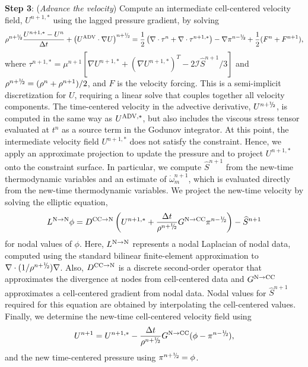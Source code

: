 {\bf Step 3}: ({\it Advance the velocity}) Compute an intermediate cell-centered velocity field, 
$U^{n+1,*}$ using the lagged pressure gradient, by solving
\begin{equation}
\rho^{n+\myhalf}\frac{U^{n+1,*}-U^n}{\Delta t} + \left(\uadv\cdot\nabla U\right)^{n+\myhalf} = \half\left(\nabla\cdot\tau^n + \nabla\cdot\tau^{n+1,*}\right) - \nabla\pi^{n-\myhalf} + \frac{1}{2}(F^n + F^{n+1}),
\label{eq:vel}
\end{equation}
where $\tau^{n+1,*} = \mu^{n+1}[\nabla U^{n+1,*} +(\nabla U^{n+1,*})^T - 2\mathcal{I}\widehat S^{n+1}/3]$ and 
$\rho^{n+\myhalf} = (\rho^n + \rho^{n+1})/2$, and $F$ is the velocity forcing.  This is a semi-implicit discretization for $U$, requiring
a linear solve that couples together all velocity components.  The time-centered velocity in the advective derivative,
$U^{n+\myhalf}$, is computed in the same way 
as $U^{{\rm ADV},*}$, but also includes the viscous stress tensor evaluated at $t^n$ as a source term
in the Godunov integrator.  At 
this point, the intermediate velocity field $U^{n+1,*}$ does not satisfy the constraint.  Hence, we apply an 
approximate projection to update the pressure and to project $U^{n+1,*}$ onto the constraint surface.  
In particular, we compute $\widehat S^{n+1}$ from the new-time 
thermodynamic variables and an estimate of $\dot\omega_m^{n+1}$, which is evaluated
directly from the new-time thermodynamic variables. We project the new-time velocity by solving the elliptic equation,
\begin{equation}
L^{{\rm N}\rightarrow{\rm N}}\phi = D^{{\rm CC}\rightarrow{\rm N}}\left(U^{n+1,*} + \frac{\Delta t}{\rho^{n+\myhalf}}G^{{\rm N}\rightarrow{\rm CC}}\pi^{n-\myhalf}\right) - \widehat S^{n+1}
\end{equation}
for nodal values of $\phi$.  Here, $L^{{\rm N}\rightarrow{\rm N}}$ represents a nodal Laplacian of nodal data, computed
using the standard bilinear finite-element approximation to $\nabla\cdot(1/\rho^{n+\myhalf})\nabla$.
Also, $D^{{\rm CC}\rightarrow{\rm N}}$ is a discrete
second-order operator that approximates the divergence at nodes from cell-centered data 
and $G^{{\rm N}\rightarrow{\rm CC}}$ approximates a cell-centered gradient from nodal data.  Nodal 
values for $\widehat S^{n+1}$ required for this equation are obtained by interpolating the cell-centered values.  Finally, we 
determine the new-time cell-centered velocity field using
\begin{equation}
U^{n+1} = U^{n+1,*} - \frac{\Delta t}{\rho^{n+\myhalf}}G^{{\rm N}\rightarrow{\rm CC}}(\phi-\pi^{n-\myhalf}),
\end{equation}
and the new time-centered pressure using $\pi^{n+\myhalf} = \phi$.


